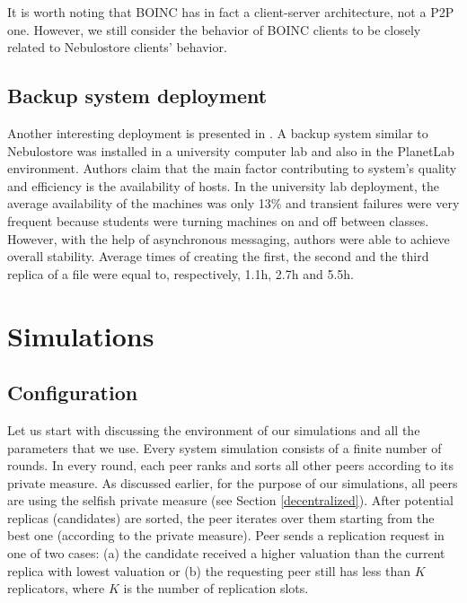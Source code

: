 \documentclass{pracamgren}
\begin{document}
It is worth noting that BOINC has in fact a client-server architecture, not a P2P one. However, we still consider the behavior of BOINC clients to be closely related to Nebulostore clients' behavior.\\

\subsection{Backup system deployment}

Another interesting deployment is presented in \cite{hetero}. A backup system similar to Nebulostore was installed in a university computer lab and also in the PlanetLab environment. Authors claim that the main factor contributing to system's quality and efficiency is the availability of hosts. In the university lab deployment, the average availability of the machines was only 13\% and transient failures were very frequent because students were turning machines on and off between classes. However, with the help of asynchronous messaging, authors were able to achieve overall stability. Average times of creating the first, the second and the third replica of a file were equal to, respectively, 1.1h, 2.7h and 5.5h.\\

\section{Simulations}

\subsection{Configuration}

Let us start with discussing the environment of our simulations and all the parameters that we use. Every system simulation consists of a finite number of rounds. In every round, each peer ranks and sorts all other peers according to its private measure. As discussed earlier, for the purpose of our simulations, all peers are using the selfish private measure (see Section \ref{decentralized}). After potential replicas (candidates) are sorted, the peer iterates over them starting from the best one (according to the private measure). Peer sends a replication request in one of two cases: (a) the candidate received a higher valuation than the current replica with lowest valuation or (b) the requesting peer still has less than $K$ replicators, where $K$ is the number of replication slots.\\
\end{document}
